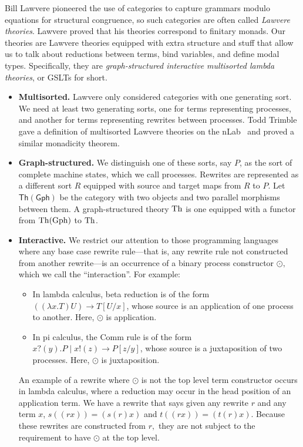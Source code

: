 \documentclass{article}
\begin{document}
Bill Lawvere pioneered the use of categories to capture grammars modulo equations for structural congruence, so such categories are often called \emph{Lawvere theories}. Lawvere proved that his theories correspond to finitary monads. Our theories are Lawvere theories equipped with extra structure and stuff that allow us to talk about reductions between terms, bind variables, and define modal types.  Specifically, they are \emph{graph-structured interactive multisorted lambda theories}, or GSLTs for short.

\begin{itemize}
    \item {\bf Multisorted.}  Lawvere only considered categories with one generating sort. We need at least two generating sorts, one for terms representing processes, and another for terms representing rewrites between processes. Todd Trimble gave a definition of multisorted Lawvere theories on the nLab~\cite{Trimble2018} and proved a similar monadicity theorem.

    \item {\bf Graph-structured.}  We distinguish one of these sorts, say $P$, as the sort of complete machine states, which we call processes. Rewrites are represented as a different sort $R$ equipped with source and target maps from $R$ to $P$. Let $\mathsf{Th(Gph)}$ be the category with two objects and two parallel morphisms between them. A graph-structured theory ${\rm Th}$ is one equipped with a functor from ${\rm Th}({\rm Gph})$ to ${\rm Th}$.

    \item {\bf Interactive.}  We restrict our attention to those programming languages where any base case rewrite rule---that is, any rewrite rule not constructed from another rewrite---is an occurrence of a binary process constructor $\odot,$ which we call the ``interaction''.  For example:

\begin{itemize}
    \item In lambda calculus, beta reduction is of the form $((\lambda x.T) U) \to T[U/x]$, whose source is an application of one process to another.  Here, $\odot$ is application.
    \item In pi calculus, the Comm rule is of the form $x?(y).P \mid x!(z) \to P[z/y]$, whose source is a juxtaposition of two processes.  Here, $\odot$ is juxtaposition.
\end{itemize}

An example of a rewrite where $\odot$ is not the top level term constructor occurs in lambda calculus, where a reduction may occur in the head position of an application term.  We have a rewrite that says given any rewrite $r$ and any term $x$, $s((r x)) = (s(r) x)$ and $t((r x)) = (t(r) x).$  Because these rewrites are constructed from $r,$ they are not subject to the requirement to have $\odot$ at the top level.


\end{itemize}
\end{document}
